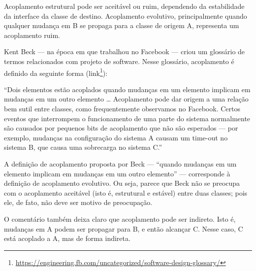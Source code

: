 \documentclass[
  11pt,
  twoside]{book}
\DeclareRobustCommand{\href}[2]{#2\footnote{\url{#1}}}
\renewenvironment{quote}{\centering \vspace{1.5ex} \begin{tcolorbox}[colback=backcolor, width=4.9in]}{\end{tcolorbox}}
\begin{document}
Acoplamento estrutural pode ser aceitável ou ruim, dependendo da
estabilidade da interface da classe de destino. Acoplamento evolutivo,
principalmente quando qualquer mudança em B se propaga para a classe de
origem A, representa um acoplamento ruim.

  Kent Beck --- na época em que
trabalhou no Facebook --- criou um glossário de termos relacionados com
projeto de software. Nesse glossário, acoplamento é definido da seguinte
forma
(\href{https://engineering.fb.com/uncategorized/software-design-glossary/}{link}):

\begin{quote}
``Dois elementos estão acoplados quando mudanças em um elemento implicam
em mudanças em um outro elemento \ldots{} Acoplamento pode dar origem a
uma relação bem sutil entre classes, como frequentemente observamos no
Facebook. Certos eventos que interrompem o funcionamento de uma parte do
sistema normalmente são causados por pequenos bits de acoplamento que
não são esperados --- por exemplo, mudanças na configuração do sistema A
causam um time-out no sistema B, que causa uma sobrecarga no sistema
C.''
\end{quote}

A definição de acoplamento proposta por Beck --- ``quando mudanças em um
elemento implicam em mudanças em um outro elemento'' --- corresponde à
definição de acoplamento evolutivo. Ou seja, parece que Beck não se
preocupa com o acoplamento aceitável (isto é, estrutural e estável)
entre duas classes; pois ele, de fato, não deve ser motivo de
preocupação.

O comentário também deixa claro que acoplamento pode ser indireto. Isto
é, mudanças em A podem ser propagar para B, e então alcançar C. Nesse
caso, C está acoplado a A, mas de forma indireta.

 
\end{document}
